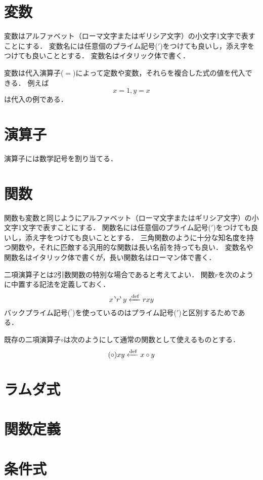 \documentclass[twocolumn]{jsbook}
\begin{document}
\section{変数}

変数はアルファベット（ローマ文字またはギリシア文字）の小文字1文字で表すことにする．
変数名には任意個のプライム記号($'$)をつけても良いし，添え字をつけても良いこととする．
変数名はイタリック体で書く．

変数は代入演算子($=$)によって定数や変数，それらを複合した式の値を代入できる．
例えば $$x=1, y=x$$ は代入の例である．

\section{演算子}

演算子には数学記号を割り当てる．


\section{関数}

関数も変数と同じようにアルファベット（ローマ文字またはギリシア文字）の小文字1文字で表すことにする．
関数名には任意個のプライム記号($'$)をつけても良いし，添え字をつけても良いこととする．
三角関数のように十分な知名度を持つ関数や，それに匹敵する汎用的な関数は長い名前を持っても良い．
変数名や関数名はイタリック体で書くが，長い関数名はローマン体で書く．


二項演算子とは2引数関数の特別な場合であると考えてよい．
関数$r$を次のように中置する記法を定義しておく．
$$x\,{}^\backprime r^\backprime\,y\xleftarrow{\text{def}} rxy$$
バックプライム記号(${}^\backprime$)を使っているのはプライム記号($'$)と区別するためである．

既存の二項演算子$\circ$は次のようにして通常の関数として使えるものとする．
$$(\circ)xy\xleftarrow{\text{def}} x\circ y$$

\section{ラムダ式}

\section{関数定義}

\section{条件式}
\end{document}
